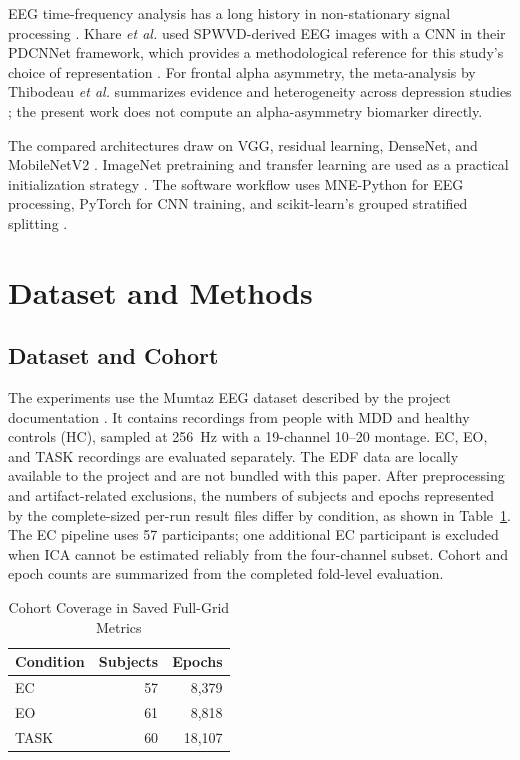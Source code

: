 \documentclass[conference]{IEEEtran}
\begin{document}
EEG time-frequency analysis has a long history in non-stationary signal
processing \cite{cohen1989,boashash2003}. Khare \emph{et al.} used
SPWVD-derived EEG images with a CNN in their PDCNNet framework, which
provides a methodological reference for this study's choice of
representation \cite{khare2021pdcnnet}. For frontal alpha asymmetry,
the meta-analysis by Thibodeau \emph{et al.} summarizes evidence and
heterogeneity across depression studies \cite{thibodeau2006}; the
present work does not compute an alpha-asymmetry biomarker directly.

The compared architectures draw on VGG, residual learning, DenseNet,
and MobileNetV2 \cite{simonyan2015,he2016,huang2017,sandler2018}.
ImageNet pretraining and transfer learning are used as a practical
initialization strategy \cite{deng2009,pan2010}. The software workflow
uses MNE-Python for EEG processing, PyTorch for CNN training, and
scikit-learn's grouped stratified splitting \cite{gramfort2013,
paszke2019,pedregosa2011}.

\section{Dataset and Methods}
\subsection{Dataset and Cohort}
The experiments use the Mumtaz EEG dataset described by the project
documentation \cite{mumtaz2019}. It contains recordings from people
with MDD and healthy controls (HC), sampled at 256~Hz with a 19-channel
10--20 montage. EC, EO, and TASK recordings are evaluated separately.
The EDF data are locally available to the project and are not bundled
with this paper. After preprocessing and artifact-related exclusions, the numbers of
subjects and epochs represented by the complete-sized per-run result
files differ by condition, as shown in Table~\ref{tab:cohort}. The EC
pipeline uses 57 participants; one additional EC participant is
excluded when ICA cannot be estimated reliably from the four-channel
subset. Cohort and epoch counts are summarized from the completed
fold-level evaluation.

\begin{table}[t]
\caption{Cohort Coverage in Saved Full-Grid Metrics}
\label{tab:cohort}
\centering
\begin{tabular}{lrr}
\toprule
\textbf{Condition} & \textbf{Subjects} & \textbf{Epochs} \\
\midrule
EC   & 57 & 8,379 \\
EO   & 61 & 8,818 \\
TASK & 60 & 18,107 \\
\bottomrule
\end{tabular}
\end{table}
\end{document}
